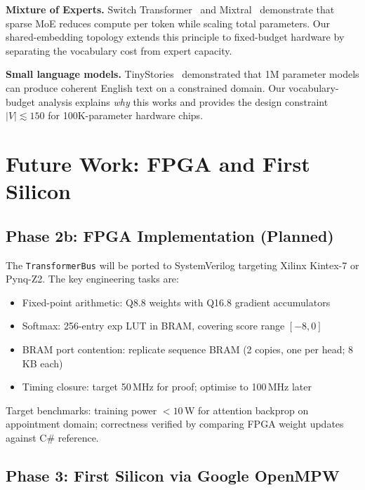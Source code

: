 \documentclass[11pt]{article}
\begin{document}
\textbf{Mixture of Experts.} Switch Transformer~\cite{fedus2022switch} and
Mixtral~\cite{jiang2024mixtral} demonstrate that sparse MoE reduces compute per
token while scaling total parameters. Our shared-embedding topology extends this
principle to fixed-budget hardware by separating the vocabulary cost from expert capacity.

\textbf{Small language models.} TinyStories~\cite{eldan2023tinystories} demonstrated
that 1M parameter models can produce coherent English text on a constrained domain.
Our vocabulary-budget analysis explains \emph{why} this works and provides the
design constraint $|V| \lesssim 150$ for 100K-parameter hardware chips.

\section{Future Work: FPGA and First Silicon}

\label{sec:future}

\subsection{Phase 2b: FPGA Implementation (Planned)}

The \texttt{TransformerBus} will be ported to SystemVerilog targeting Xilinx Kintex-7
or Pynq-Z2. The key engineering tasks are:

\begin{itemize}
\item Fixed-point arithmetic: Q8.8 weights with Q16.8 gradient accumulators
\item Softmax: 256-entry exp LUT in BRAM, covering score range $[-8, 0]$
\item BRAM port contention: replicate sequence BRAM (2 copies, one per head; 8\,KB each)
\item Timing closure: target 50\,MHz for proof; optimise to 100\,MHz later
\end{itemize}

Target benchmarks: training power $<10$\,W for attention backprop on appointment domain;
correctness verified by comparing FPGA weight updates against C\# reference.

\subsection{Phase 3: First Silicon via Google OpenMPW}
\end{document}
